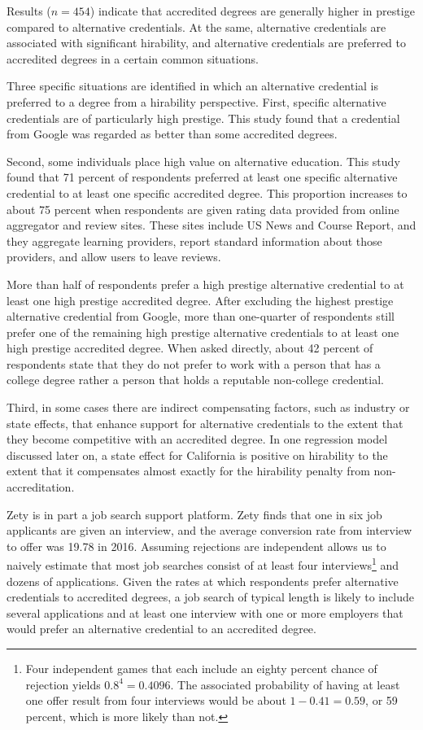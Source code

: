 \documentclass[review]{elsarticle}
\begin{document}
Results ($n = 454$) indicate that accredited degrees are generally higher in prestige compared to alternative credentials.
At the same, alternative credentials are associated with significant hirability,
and alternative credentials are preferred to accredited degrees in a certain common situations.

Three specific situations are identified in which an alternative credential is preferred to a degree from a hirability perspective.
First, specific alternative credentials are of particularly high prestige.
This study found that a credential from Google was regarded as better than some accredited degrees.

Second, some individuals place high value on alternative education.
This study found that 71 percent of respondents preferred at least one specific alternative credential to at least one specific accredited degree.
This proportion increases to about 75 percent when respondents are given rating data provided from online aggregator and review sites.
These sites include US News and Course Report, and they aggregate learning providers, report standard information about those providers, and allow users to leave reviews.

More than half of respondents prefer a high prestige alternative credential to at least one high prestige accredited degree.
After excluding the highest prestige alternative credential from Google,
more than one-quarter of respondents still prefer one of the remaining high prestige alternative credentials to at least one high prestige accredited degree.
When asked directly, about 42 percent of respondents state that they do not prefer
to work with a person that has a college degree rather a person that holds a reputable non-college credential.

Third, in some cases there are indirect compensating factors, such as industry or state effects,
that enhance support for alternative credentials to the extent that they become competitive with an accredited degree.
In one regression model discussed later on, a state effect for California is positive on hirability
to the extent that it compensates almost exactly for the hirability penalty from non-accreditation.

Zety is in part a job search support platform.
Zety finds that one in six job applicants are given an interview,
and the average conversion rate from interview to offer was 19.78 in 2016\cite{turczynski_2021}.
Assuming rejections are independent allows us to naively estimate that most job searches consist of at least four interviews\footnote{
    Four independent games that each include an eighty percent chance of rejection yields $0.8^4 = 0.4096$.
    The associated probability of having at least one offer result from four interviews would be about $1 - 0.41 = 0.59$,
    or 59 percent, which is more likely than not.
} and dozens of applications.
Given the rates at which respondents prefer alternative credentials to accredited degrees,
a job search of typical length is likely to include several applications and at least one interview
with one or more employers that would prefer an alternative credential to an accredited degree.
\end{document}
